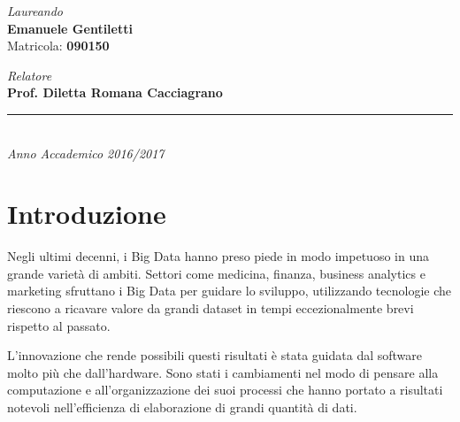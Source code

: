 \documentclass[italian,a4paper, twoside, 12pt]{report}
\begin{document}
\begin{titlepage}
\begin{minipage}[t]{0.47\textwidth}
    \begin{center}
    {\LARGE{\textsl{Laureando}
    \vspace{0.2cm}\\
    \textbf{Emanuele Gentiletti}\\
    \vspace{1.7cm}
    Matricola: \textbf{090150}
    }}

    \end{center}
\end{minipage}
\hfill
\begin{minipage}[t]{0.47\textwidth}
    \begin{center}
    {\LARGE{\textsl{Relatore}
    \vspace{0.2cm}\\
    \bf Prof. Diletta Romana Cacciagrano\\
    }}

    \end{center}
\end{minipage}
\vspace{35mm}
\begin{center}
\rule[0.1cm]{14cm}{0.1mm}\\
\vspace{2mm}
{\Large{\textsl{Anno Accademico 2016/2017}}}
\end{center}
\end{titlepage}
\restoregeometry
\clearpage
\cleardoublepage

{
\hypersetup{linkcolor=black}
\setcounter{tocdepth}{2}
\tableofcontents
}
\clearpage

\chapter*{Introduzione}\label{introduzione}

Negli ultimi decenni, i Big Data hanno preso piede in modo impetuoso in
una grande varietà di ambiti. Settori come medicina, finanza, business
analytics e marketing sfruttano i Big Data per guidare lo sviluppo,
utilizzando tecnologie che riescono a ricavare valore da grandi dataset
in tempi eccezionalmente brevi rispetto al passato.

L'innovazione che rende possibili questi risultati è stata guidata dal
software molto più che dall'hardware. Sono stati i cambiamenti nel modo
di pensare alla computazione e all'organizzazione dei suoi processi che
hanno portato a risultati notevoli nell'efficienza di elaborazione di
grandi quantità di dati.
\end{document}

